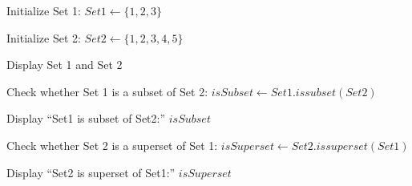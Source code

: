\begin{algorithm}
\caption{Demonstrate Subset and Superset Relations Between Sets}
\begin{algorithmic}[1]

\STATE Initialize Set 1:
\STATE $Set1 \gets \{1,2,3\}$

\STATE Initialize Set 2:
\STATE $Set2 \gets \{1,2,3,4,5\}$

\STATE Display Set 1 and Set 2

\STATE Check whether Set 1 is a subset of Set 2:
\STATE $isSubset \gets Set1.issubset(Set2)$

\STATE Display ``Set1 is subset of Set2:'' $isSubset$

\STATE Check whether Set 2 is a superset of Set 1:
\STATE $isSuperset \gets Set2.issuperset(Set1)$

\STATE Display ``Set2 is superset of Set1:'' $isSuperset$

\end{algorithmic}
\end{algorithm}